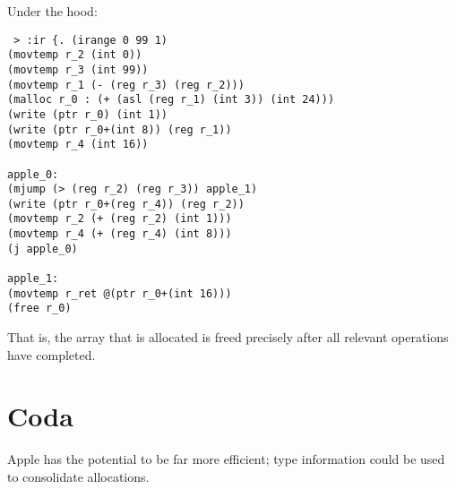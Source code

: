 \documentclass{article}
\begin{document}
Under the hood:

\begin{verbatim}
 > :ir {. (irange 0 99 1)
(movtemp r_2 (int 0))
(movtemp r_3 (int 99))
(movtemp r_1 (- (reg r_3) (reg r_2)))
(malloc r_0 : (+ (asl (reg r_1) (int 3)) (int 24)))
(write (ptr r_0) (int 1))
(write (ptr r_0+(int 8)) (reg r_1))
(movtemp r_4 (int 16))

apple_0:
(mjump (> (reg r_2) (reg r_3)) apple_1)
(write (ptr r_0+(reg r_4)) (reg r_2))
(movtemp r_2 (+ (reg r_2) (int 1)))
(movtemp r_4 (+ (reg r_4) (int 8)))
(j apple_0)

apple_1:
(movtemp r_ret @(ptr r_0+(int 16)))
(free r_0)
\end{verbatim}

That is, the array that is allocated is freed precisely after all relevant operations have completed.

\section{Coda}

Apple has the potential to be far more efficient; type information could be used to consolidate allocations.
\end{document}
